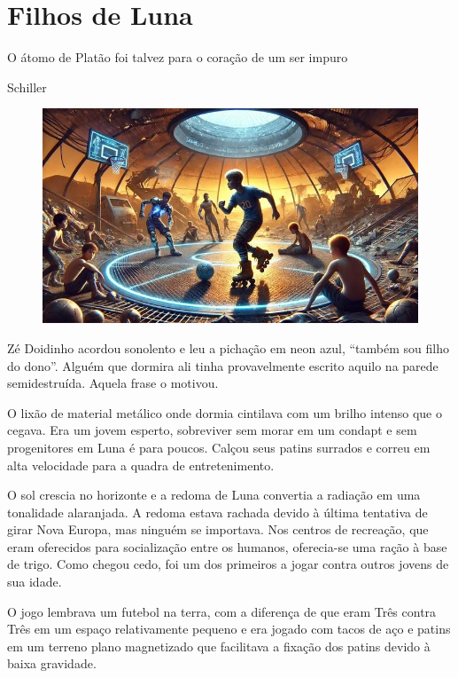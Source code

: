 \documentclass[a4paper,14pt]{book}
\begin{document}

\chapter{Filhos de Luna}

\epigraph{O átomo de Platão foi talvez para o coração de um ser impuro}{Schiller}

\begin{figure}[h!]
    \includegraphics[width=1\linewidth]{img/filho_de_luna.jpg}
\end{figure}

Zé Doidinho acordou sonolento e leu a pichação em neon azul, “também sou filho do dono”. Alguém que dormira ali tinha provavelmente escrito aquilo na parede semidestruída. Aquela frase o motivou.

O lixão de material metálico onde dormia cintilava com um brilho intenso que o cegava. Era um jovem esperto, sobreviver sem morar em um condapt e sem progenitores em Luna é para poucos. Calçou seus patins surrados e correu em alta velocidade para a quadra de entretenimento.

O sol crescia no horizonte e a redoma de Luna convertia a radiação em uma tonalidade alaranjada. A redoma estava rachada devido à última tentativa de girar Nova Europa, mas ninguém se importava. Nos centros de recreação, que eram oferecidos para socialização entre os humanos, oferecia-se uma ração à base de trigo. Como chegou cedo, foi um dos primeiros a jogar contra outros jovens de sua idade.

O jogo lembrava um futebol na terra, com a diferença de que eram Três contra Três em um espaço relativamente pequeno e era jogado com tacos de aço e patins em um terreno plano magnetizado que facilitava a fixação dos patins devido à baixa gravidade.
\end{document}
